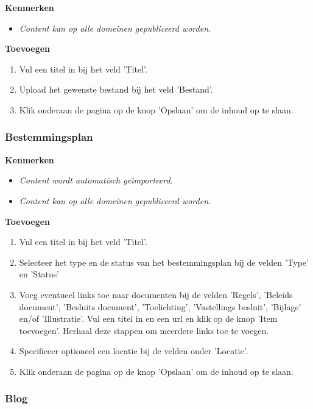 \textbf{Kenmerken}

\begin{itemize}
\item \emph{Content kan op alle domeinen gepubliceerd worden.}
\end{itemize}

\textbf{Toevoegen}

\begin{enumerate}
\item Vul een titel in bij het veld 'Titel'.
\item Upload het gewenste bestand bij het veld 'Bestand'.
\item Klik onderaan de pagina op de knop 'Opslaan' om de inhoud op te slaan.
\end{enumerate}

\subsubsection{Bestemmingsplan}\label{bestemmingsplan}

\textbf{Kenmerken}

\begin{itemize}
\item \emph{Content wordt automatisch ge{\"\i}mporteerd.}
\item \emph{Content kan op alle domeinen gepubliceerd worden.}
\end{itemize}

\textbf{Toevoegen}

\begin{enumerate}
\item Vul een titel in bij het veld 'Titel'.
\item Selecteer het type en de status van het bestemmingsplan bij de velden 'Type' en 'Status'
\item Voeg eventueel links toe naar documenten bij de velden 'Regels', 'Beleids document', 'Besluits document', 'Toelichting', 'Vastellings besluit', 'Bijlage' en/of 'Illustratie'. Vul een titel in en een url en klik op de knop 'Item toevoegen'. Herhaal deze stappen om meerdere links toe te voegen. 
\item Specificeer optioneel een locatie bij de velden onder 'Locatie'.
\item Klik onderaan de pagina op de knop 'Opslaan' om de inhoud op te slaan.
\end{enumerate}

\subsubsection{Blog}\label{blog}

